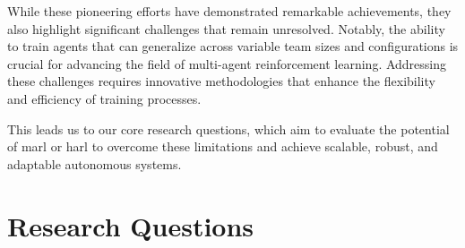 While these pioneering efforts have demonstrated remarkable achievements, 
they also highlight significant challenges that remain unresolved. 
Notably, the ability to train agents that can generalize across variable 
team sizes and configurations is crucial for advancing the field of 
multi-agent reinforcement learning. Addressing these challenges requires 
innovative methodologies that enhance the flexibility and efficiency of 
training processes. 

This leads us to our core research questions, which aim to evaluate
the potential of \gls{marl} or \gls{harl} to overcome these limitations 
and achieve scalable, robust, and adaptable autonomous systems.

%

\section{Research Questions}%
\label{sec:research_question}%
\label{sec:relevance_and_importance}


